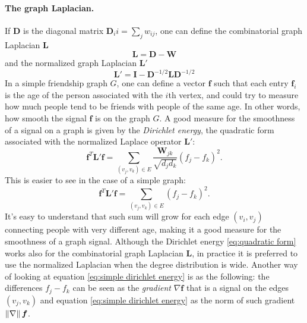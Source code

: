 \paragraph{The graph Laplacian.}
If $\mathbf D$ is the diagonal matrix $\mathbf D_ii = \sum_j w_{ij}$, one can define \cite{Vandergheynst} the combinatorial graph Laplacian $\mathbf L$
\begin{equation}\label{eq:graph Laplacian}
		\mathbf L = \mathbf D-\mathbf W
\end{equation}
 and the normalized graph Laplacian $\mathbf L'$
\begin{equation}\label{eq:normalized graph Laplacian}
\mathbf L' = \mathbf I - \mathbf D^{-1/2}\mathbf L\mathbf D^{-1/2}
\end{equation}
In a simple friendship graph $G$, one can define a vector $\mathbf f$ such that each entry $\mathbf f_i$ is the age of the person associated with the $i$th vertex, and could try to measure how much people tend to be friends with people of the same age. In other words, how smooth the signal $\mathbf f$ is on the graph $G$. A good measure for the smoothness of a signal on a graph is given by the \textit{Dirichlet energy}, the quadratic form associated with the normalized Laplace operator $\mathbf L'$:
\begin{equation}\label{eq:quadratic form}
	\mathbf f^T \mathbf L' \mathbf f = \sum_{\left(v_{j}, v_{k}\right) \in {E}} \frac{\boldsymbol{W}_{j k}}{\sqrt{d_{j} {d}_{k}}}\left({f}_{j}-{f}_{k}\right)^{2}.
\end{equation}
This is easier to see in the case of a simple graph:
\begin{equation}\label{eq:simple dirichlet energy}
	\mathbf f^T \mathbf L' \mathbf f = \sum_{\left(v_{j}, v_{k}\right) \in {E}} \left({f}_{j}-{f}_{k}\right)^{2}.
\end{equation}
It's easy to understand that such sum will grow for each edge $(v_i, v_j)$ connecting people with very different age, making it a good measure for the smoothness of a graph signal. Although the Dirichlet energy \ref{eq:quadratic form} works also for the combinatorial graph Laplacian $\mathbf L$, in practice it is preferred to use the normalized Laplacian when the degree distribution is wide. Another way of looking at equation \ref{eq:simple dirichlet energy} is as the following: the differences ${f}_j-{f}_k$ can be seen as the \textit{gradient} $\nabla \boldsymbol{f}$ that is a signal on the edges $(v_j, v_k)$ and equation \ref{eq:simple dirichlet energy} as the norm of such gradient $\left\lVert\nabla\right\rVert \boldsymbol{f}$.
